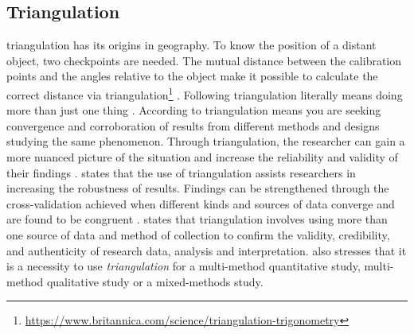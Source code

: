 \subsection{Triangulation}
\label{sub:triangulation}
\Gls{triangulation} has its origins in geography. To know the position of a distant object, two checkpoints are needed. The mutual distance between the calibration points and the angles relative to the object make it possible to calculate the correct distance via triangulation\footnote{\url{https://www.britannica.com/science/triangulation-trigonometry}} \parencite[p.~88]{Mortelmans2018}. Following \textcite[p.~88]{Recker2012} \gls{triangulation} literally means doing more than just one thing \parencite[p.~88]{Recker2012}. According to \textcite[p.~110]{Recker2012} \gls{triangulation} means you are seeking convergence and corroboration of results from different methods and designs studying the same phenomenon. Through \gls{triangulation}, the researcher can gain a more nuanced picture of the situation and increase the reliability and validity of their findings \parencite[p.~88]{Recker2012}. \textcite[p.~88]{Recker2012} states that the use of \gls{triangulation} assists researchers in increasing the \gls{robustness} of results. Findings can be strengthened through the cross-validation achieved when different kinds and sources of data converge and are found to be congruent \parencite[p.~88]{Recker2012}. \textcite[p.~207]{Saunders2015} states that \gls{triangulation} involves using more than one source of data and method of collection to confirm the validity, credibility, and authenticity of research data, analysis and interpretation. \textcite[p.~207]{Saunders2015} also stresses that it is a necessity to use \textit{\gls{triangulation}} for a multi-method quantitative study, multi-method qualitative study or a mixed-methods study.

